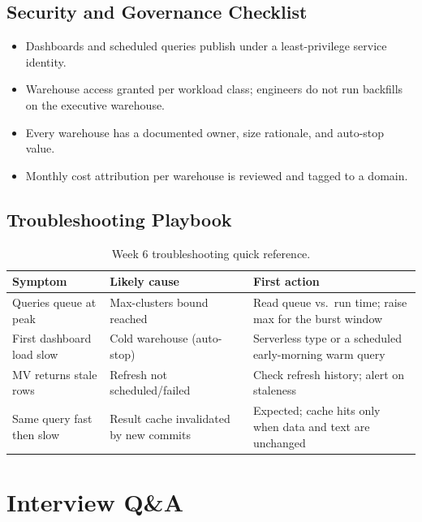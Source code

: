 \subsection{Security and Governance Checklist}
\begin{itemize}
    \item Dashboards and scheduled queries publish under a least-privilege service identity.
    \item Warehouse access granted per workload class; engineers do not run backfills on the executive warehouse.
    \item Every warehouse has a documented owner, size rationale, and auto-stop value.
    \item Monthly cost attribution per warehouse is reviewed and tagged to a domain.
\end{itemize}

\subsection{Troubleshooting Playbook}
\begin{table}[H]
\centering
\small
\begin{tabular}{@{}p{3.6cm}p{4.2cm}p{4.8cm}@{}}
\toprule
\textbf{Symptom} & \textbf{Likely cause} & \textbf{First action} \\
\midrule
Queries queue at peak & Max-clusters bound reached & Read queue vs.\ run time; raise max for the burst window \\
First dashboard load slow & Cold warehouse (auto-stop) & Serverless type or a scheduled early-morning warm query \\
MV returns stale rows & Refresh not scheduled/failed & Check refresh history; alert on staleness \\
Same query fast then slow & Result cache invalidated by new commits & Expected; cache hits only when data and text are unchanged \\
\bottomrule
\end{tabular}
\caption{Week 6 troubleshooting quick reference.}
\label{tab:ch6-trouble}
\end{table}

\section{Interview Q\&A}
